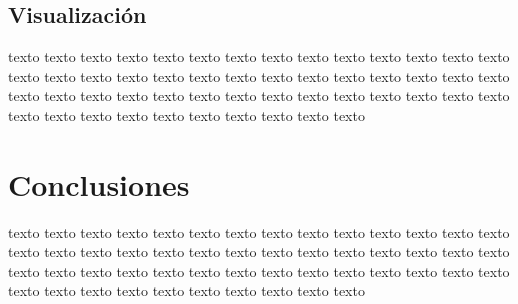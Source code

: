 \documentclass[
11pt, %
]{charter}
\begin{document}
\pagebreak
\subsection{Visualización}

texto texto texto texto texto texto texto texto texto texto texto texto texto texto texto texto texto texto texto texto texto texto texto texto texto texto texto texto texto texto texto texto texto texto texto texto texto texto texto texto texto texto texto texto texto texto texto texto texto texto texto texto 


\pagebreak
\section{Conclusiones}

texto texto texto texto texto texto texto texto texto texto texto texto texto texto texto texto texto texto texto texto texto texto texto texto texto texto texto texto texto texto texto texto texto texto texto texto texto texto texto texto texto texto texto texto texto texto texto texto texto texto texto texto 
\end{document}
